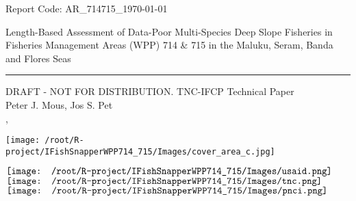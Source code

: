 \begin{titlepage}
\begin{flushleft}
	\textsf{Report Code: AR\_714715\_{\today}}
\end{flushleft}

\vspace*{2cm}
\begin{flushright}
        {\Large\textsf{Length-Based Assessment of Data-Poor Multi-Species Deep Slope Fisheries in 
        \\[0.2cm] Fisheries Management Areas (WPP) 714 \& 715 in the Maluku, Seram, Banda and Flores Seas}}\\[0.2cm]
        \rule{\linewidth}{0.5mm}
        \textsf{DRAFT - NOT FOR DISTRIBUTION. TNC-IFCP Technical Paper}\\[2cm]
        \textsf{Peter J. Mous, Jos S. Pet\\[1cm]
        {\MakeUppercase{\MONTH}} {\the\day}, {\the\year}}
\end{flushright}

\begin{center}
\texttt{[image: /root/R-project/IFishSnapperWPP714\_715/Images/cover\_area\_c.jpg]}
\end{center}

\vfill

\noindent
\begin{minipage}[b]{\linewidth}
\noindent
\centering
$\vcenter{\hbox{\texttt{[image: /root/R-project/IFishSnapperWPP714\_715/Images/usaid.png]}}}$
\hfill
$\vcenter{\hbox{\texttt{[image: /root/R-project/IFishSnapperWPP714\_715/Images/tnc.png]}}}$
\hfill
$\vcenter{\hbox{\texttt{[image: /root/R-project/IFishSnapperWPP714\_715/Images/pnci.png]}}}$
\end{minipage}
\end{titlepage}